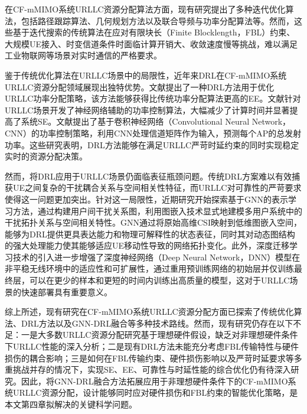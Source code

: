 在CF-mMIMO系统URLLC资源分配算法方面，现有研究提出了多种迭代优化算法，包括路径跟踪算法\cite{chapterone35}、几何规划方法\cite{chapterone36}以及联合导频与功率分配算法\cite{chapterone37}等。然而，这些基于迭代搜索的传统算法在应对有限块长（Finite Blocklength，FBL）约束、大规模UE接入、时变信道条件时面临计算开销大、收敛速度慢等挑战，难以满足工业物联网等场景对实时通信的严格要求\cite{chapterone38}。

鉴于传统优化算法在URLLC场景中的局限性，近年来DRL在CF-mMIMO系统URLLC资源分配领域展现出独特优势\cite{chapterone39}。文献\textcite{chapterone40}提出了一种DRL方法用于优化URLLC功率分配策略，该方法能够获得比传统功率分配算法更高的EE。文献\textcite{chapterone41}针对URLLC场景开发了神经网络辅助的功率控制算法，大幅减少了计算时间并显著提高了系统SE。文献\textcite{chapterone42}提出了基于卷积神经网络（Convolutional Neural Network，CNN）的功率控制策略，利用CNN处理信道矩阵作为输入，预测每个AP的总发射功率。这些研究表明，DRL方法能够在满足URLLC严苛时延约束的同时实现稳定实时的资源分配决策。

然而，将DRL应用于URLLC场景仍面临表征瓶颈问题。传统DRL方案难以有效捕获UE之间复杂的干扰耦合关系与空间相关性特征，而URLLC对可靠性的严苛要求使得这一问题更加突出。针对这一局限性，近期研究开始探索基于GNN的表示学习方法，通过构建用户间干扰关系图，利用图嵌入技术显式地建模多用户系统中的干扰拓扑关系与空间相关特性。GNN通过将原始高维CSI映射到低维图嵌入空间，能够为DRL提供更具表达能力和物理可解释性的状态表征，同时其对动态图结构的强大处理能力使其能够适应UE移动性导致的网络拓扑变化。此外，深度迁移学习技术的引入进一步增强了深度神经网络（Deep Neural Network，DNN）模型在非平稳无线环境中的适应性和可扩展性\cite{chapterone43}，通过重用预训练网络的初始层并仅训练最终层，可以在更少的样本和更短的时间内训练出高质量的模型，这对于URLLC场景的快速部署具有重要意义。

综上所述，现有研究在CF-mMIMO系统URLLC资源分配方面已探索了传统优化算法、DRL方法以及GNN-DRL融合等多种技术路线。然而，现有研究仍存在以下不足：一是大多数URLLC资源分配研究基于理想硬件假设，缺乏对非理想硬件条件下URLLC性能的深入分析；二是现有DRL方法未能充分考虑FBL传输特性与硬件损伤的耦合影响；三是如何在FBL传输约束、硬件损伤影响以及严苛时延要求等多重挑战并存的情况下，实现SE、EE、可靠性与时延性能的综合优化仍有待深入研究。因此，将GNN-DRL融合方法拓展应用于非理想硬件条件下的CF-mMIMO系统URLLC资源分配，设计能够同时应对硬件损伤和FBL约束的智能优化策略，是本文第四章拟解决的关键科学问题。

